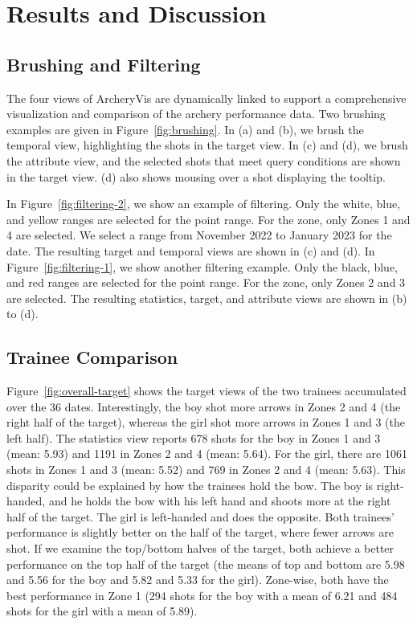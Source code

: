 \documentclass[runningheads]{llncs}
\begin{document}
\section{Results and Discussion}

\subsection{Brushing and Filtering}

The four views of ArcheryVis are dynamically linked to support a comprehensive visualization and comparison of the archery performance data. Two brushing examples are given in Figure~\ref{fig:brushing}. 
In (a) and (b), we brush the temporal view, highlighting the shots in the target view. 
In (c) and (d), we brush the attribute view, and the selected shots that meet query conditions are shown in the target view.
(d) also shows mousing over a shot displaying the tooltip. 

In Figure~\ref{fig:filtering-2}, we show an example of filtering. 
Only the white, blue, and yellow ranges are selected for the point range. 
For the zone, only Zones 1 and 4 are selected. We select a range from November 2022 to January 2023 for the date. The resulting target and temporal views are shown in (c) and (d). 
%
In Figure~\ref{fig:filtering-1}, we show another filtering example. 
Only the black, blue, and red ranges are selected for the point range. 
For the zone, only Zones 2 and 3 are selected. The resulting statistics, target, and attribute views are shown in (b) to (d). 

\subsection{Trainee Comparison}
\label{subsec:tc}

Figure~\ref{fig:overall-target} shows the target views of the two trainees accumulated over the 36 dates. 
Interestingly, the boy shot more arrows in Zones 2 and 4 (the right half of the target), whereas the girl shot more arrows in Zones 1 and 3 (the left half). 
The statistics view reports 678 shots for the boy in Zones 1 and 3 (mean: 5.93) and 1191 in Zones 2 and 4 (mean: 5.64). 
For the girl, there are 1061 shots in Zones 1 and 3 (mean: 5.52) and 769 in Zones 2 and 4 (mean: 5.63). 
This disparity could be explained by how the trainees hold the bow. 
The boy is right-handed, and he holds the bow with his left hand and shoots more at the right half of the target. 
The girl is left-handed and does the opposite. 
Both trainees' performance is slightly better on the half of the target, where fewer arrows are shot. 
If we examine the top/bottom halves of the target, both achieve a better performance on the top half of the target (the means of top and bottom are 5.98 and 5.56 for the boy and 5.82 and 5.33 for the girl). 
Zone-wise, both have the best performance in Zone 1 (294 shots for the boy with a mean of 6.21 and 484 shots for the girl with a mean of 5.89).
\end{document}
